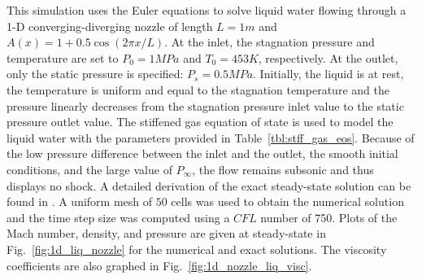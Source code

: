 \documentclass[preprint,10pt]{elsarticle}
\newcommand{\fig}[1]{Fig.~\ref{#1}}                      %
\newcommand{\tbl}[1]{Table~\ref{#1}}                     %
\begin{document}
This simulation uses the Euler equations to solve liquid water flowing through a 1-D converging-diverging nozzle of length $L=1m$ and $A(x) = 1 + 0.5 \cos(2 \pi x / L)$.  At the inlet, the stagnation pressure and temperature are set to $P_0 = 1 MPa$ and $T_0 = 453 K$, respectively. At the outlet, only the static pressure is specified: $P_s = 0.5MPa$. 
Initially, the liquid is at rest, the temperature is uniform and equal to the stagnation temperature and the pressure linearly decreases from the stagnation pressure inlet value to the static pressure outlet value. 
The stiffened gas equation of state is used to model the liquid water with the parameters provided in \tbl{tbl:stff_gas_eos}.
Because of the low pressure difference between the inlet and the outlet, the smooth initial conditions, and the large value of $P_\infty$, the flow remains subsonic and thus displays no shock. A detailed derivation of the exact steady-state solution can be found in \cite{nozzle_exact}. A uniform mesh of $50$ cells was used to obtain the numerical solution and the time step size was computed using a $CFL$ number of 750.
Plots of the Mach number, density, and pressure are given at steady-state in \fig{fig:1d_liq_nozzle} for the numerical and exact solutions. The viscosity coefficients are also graphed in \fig{fig:1d_nozzle_liq_visc}. 
\end{document}

